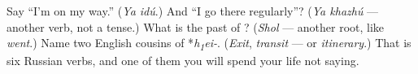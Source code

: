 \begin{tcolorbox}[breakable,colback=teal!4,colframe=teal!35!black,title={Before you move on}]
Say \textquotedblleft{}I'm on my way.\textquotedblright{} (\emph{Ya idú}.) And \textquotedblleft{}I go there regularly\textquotedblright{}? (\emph{Ya khazhú} — another verb, not a tense.) What is the past of \emph{}? (\emph{Shol} — another root, like \emph{went}.) Name two English cousins of *\emph{h\textsubscript{1}ei-}. (\emph{Exit}, \emph{transit} — or \emph{itinerary}.) That is six Russian verbs, and one of them you will spend your life not saying.
\end{tcolorbox}
